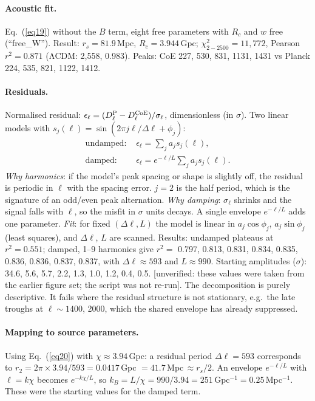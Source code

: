 \documentclass[10pt,twocolumn]{article}
\newcommand{\flag}[1]{\textsf{[unverified: #1]}}
\begin{document}
\paragraph{Acoustic fit.} Eq.~(\ref{eq19}) without the $B$ term, eight free parameters with $R_c$ and $w$ free (``free\_W''). Result: $r_s=81.9$\,Mpc, $R_c=3.944$\,Gpc; $\chi^2_{2-2500}=11{,}772$, Pearson $r^2=0.871$ (ΛCDM: 2{,}558, 0.983). Peaks: CoE 227, 530, 831, 1131, 1431 vs Planck 224, 535, 821, 1122, 1412.

\paragraph{Residuals.} Normalised residual: $\epsilon_\ell=(D^{\rm P}_\ell-D^{\rm CoE}_\ell)/\sigma_\ell$, dimensionless (in $\sigma$). Two linear models with $s_j(\ell)=\sin(2\pi j\ell/\Delta\ell+\phi_j)$:
\begin{align}
\text{undamped: }&\epsilon_\ell=\textstyle\sum_ja_js_j(\ell),\label{eq22}\\
\text{damped: }&\epsilon_\ell=e^{-\ell/L}\textstyle\sum_ja_js_j(\ell).\label{eq23}
\end{align}
\emph{Why harmonics}: if the model's peak spacing or shape is slightly off, the residual is periodic in $\ell$ with the spacing error. $j=2$ is the half period, which is the signature of an odd/even peak alternation. \emph{Why damping}: $\sigma_\ell$ shrinks and the signal falls with $\ell$, so the misfit in $\sigma$ units decays. A single envelope $e^{-\ell/L}$ adds one parameter. \emph{Fit}: for fixed $(\Delta\ell,L)$ the model is linear in $a_j\cos\phi_j$, $a_j\sin\phi_j$ (least squares), and $\Delta\ell$, $L$ are scanned. Results: undamped plateaus at $r^2=0.551$; damped, 1--9 harmonics give $r^2=$ 0.797, 0.813, 0.831, 0.834, 0.835, 0.836, 0.836, 0.837, 0.837, with $\Delta\ell\approx593$ and $L\approx990$. Starting amplitudes ($\sigma$): 34.6, 5.6, 5.7, 2.2, 1.3, 1.0, 1.2, 0.4, 0.5. \flag{these values were taken from the earlier figure set; the script was not re-run}. The decomposition is purely descriptive. It fails where the residual structure is not stationary, e.g.\ the late troughs at $\ell\sim1400$, 2000, which the shared envelope has already suppressed.

\paragraph{Mapping to source parameters.} Using Eq.~(\ref{eq20}) with $\chi\approx3.94$\,Gpc: a residual period $\Delta\ell=593$ corresponds to $r_2=2\pi\times3.94/593=0.0417$\,Gpc $=41.7$\,Mpc$\,\approx r_s/2$. An envelope $e^{-\ell/L}$ with $\ell=k\chi$ becomes $e^{-k\chi/L}$, so $k_B=L/\chi=990/3.94=251$\,Gpc$^{-1}=0.25$\,Mpc$^{-1}$. These were the starting values for the damped term.
\end{document}
